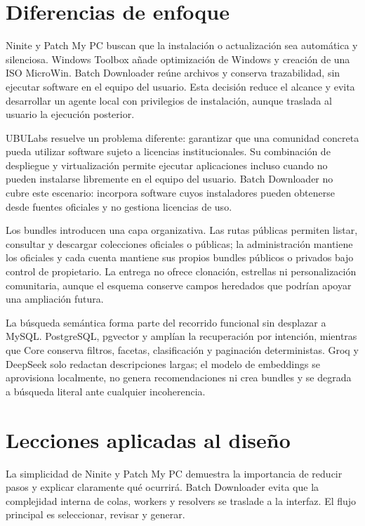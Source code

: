 \section{Diferencias de enfoque}

Ninite y Patch My PC buscan que la instalación o actualización sea automática y silenciosa. Windows Toolbox añade optimización de Windows y creación de una ISO MicroWin. Batch Downloader reúne archivos y conserva trazabilidad, sin ejecutar software en el equipo del usuario. Esta decisión reduce el alcance y evita desarrollar un agente local con privilegios de instalación, aunque traslada al usuario la ejecución posterior.

UBULabs resuelve un problema diferente: garantizar que una comunidad concreta pueda utilizar software sujeto a licencias institucionales. Su combinación de despliegue y virtualización permite ejecutar aplicaciones incluso cuando no pueden instalarse libremente en el equipo del usuario. Batch Downloader no cubre este escenario: incorpora software cuyos instaladores pueden obtenerse desde fuentes oficiales y no gestiona licencias de uso.

Los bundles introducen una capa organizativa. Las rutas públicas permiten listar, consultar y descargar colecciones oficiales o públicas; la administración mantiene los oficiales y cada cuenta mantiene sus propios bundles públicos o privados bajo control de propietario. La entrega no ofrece clonación, estrellas ni personalización comunitaria, aunque el esquema conserve campos heredados que podrían apoyar una ampliación futura.

La búsqueda semántica forma parte del recorrido funcional sin desplazar a MySQL. PostgreSQL, pgvector y  amplían la recuperación por intención, mientras que Core conserva filtros, facetas, clasificación y paginación deterministas. Groq y DeepSeek solo redactan descripciones largas; el modelo de embeddings se aprovisiona localmente, no genera recomendaciones ni crea bundles y se degrada a búsqueda literal ante cualquier incoherencia.

\section{Lecciones aplicadas al diseño}

La simplicidad de Ninite y Patch My PC demuestra la importancia de reducir pasos y explicar claramente qué ocurrirá. Batch Downloader evita que la complejidad interna de colas, workers y resolvers se traslade a la interfaz. El flujo principal es seleccionar, revisar y generar.

